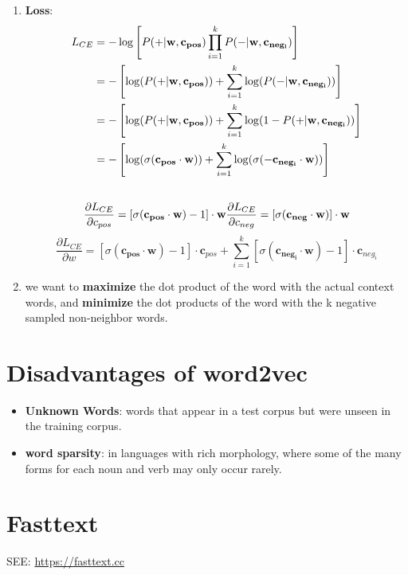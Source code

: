 \begin{enumerate}
    \item \textbf{Loss}:
    \begin{align}
        L_{CE} \notag
        &= -\log\left[ P(+|\mathbf{w, c_{pos}}) \prod_{i=1}^{k} P(-|\mathbf{w, c_{neg_i}}) \right]\\ \notag
        &= -\left[ \log(P(+|\mathbf{w, c_{pos}})) + \sum_{i=1}^{k} \log(P(-|\mathbf{w, c_{neg_i}})) \right]\\ \notag
        &= -\left[ \log(P(+|\mathbf{w, c_{pos}})) + \sum_{i=1}^{k} \log(1-P(+|\mathbf{w, c_{neg_i}})) \right]\\ \notag
        &= -\left[ \log(\sigma(\mathbf{c_{pos}\cdot w})) + \sum_{i=1}^{k} \log(\sigma(\mathbf{-c_{neg_i}\cdot w})) \right]\\ \notag
    \end{align}
    \[
        \displaystyle \frac{\partial L_{CE}}{\partial c_{pos}} = [\sigma(\mathbf{c_{pos}\cdot w})-1]\cdot \mathbf{w} \hfill \displaystyle \frac{\partial L_{CE}}{\partial c_{neg}} = [\sigma(\mathbf{c_{neg}\cdot w})]\cdot \mathbf{w}
    \]
    \[
        \displaystyle \frac{\partial L_{CE}}{\partial w} = [\sigma(\mathbf{c_{pos}\cdot w})-1]\cdot \mathbf{c}_{pos} + \sum_{i=1}^{k}[\sigma(\mathbf{c_{neg_i}\cdot w})-1]\cdot \mathbf{c}_{neg_i}
    \]


    \item we want to \textbf{maximize} the dot product of the word with the actual context words, and \textbf{minimize} the dot products of the word with the k negative sampled non-neighbor words.

    
    
\end{enumerate}

\section*{Disadvantages of word2vec \cite{nlp-1}}
\begin{itemize}
    \item \textbf{Unknown Words}: words that appear in a test corpus but were unseen in the training corpus.

    \item \textbf{word sparsity}: in languages with rich morphology, where some of the many forms for each noun and verb may only occur rarely.
\end{itemize}

\section{Fasttext \cite{nlp-1}}\label{Fasttext}
SEE: \url{https://fasttext.cc}

